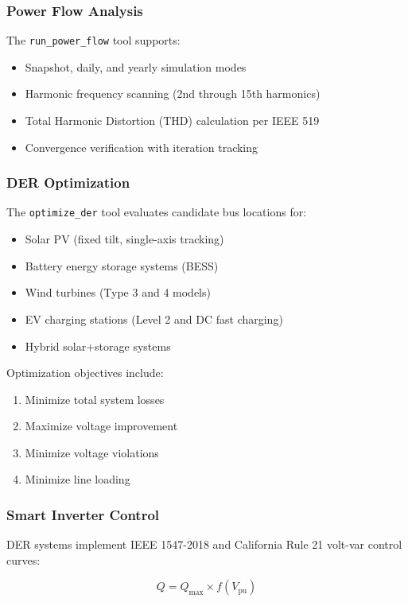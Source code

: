 \documentclass[review]{elsarticle}
\begin{document}
\subsubsection{Power Flow Analysis}
The \texttt{run\_power\_flow} tool supports:
\begin{itemize}
    \item Snapshot, daily, and yearly simulation modes
    \item Harmonic frequency scanning (2nd through 15th harmonics)
    \item Total Harmonic Distortion (THD) calculation per IEEE 519 \cite{ieee519}
    \item Convergence verification with iteration tracking
\end{itemize}

\subsubsection{DER Optimization}
The \texttt{optimize\_der} tool evaluates candidate bus locations for:
\begin{itemize}
    \item Solar PV (fixed tilt, single-axis tracking)
    \item Battery energy storage systems (BESS)
    \item Wind turbines (Type 3 and 4 models)
    \item EV charging stations (Level 2 and DC fast charging)
    \item Hybrid solar+storage systems
\end{itemize}

Optimization objectives include:
\begin{enumerate}
    \item Minimize total system losses
    \item Maximize voltage improvement
    \item Minimize voltage violations
    \item Minimize line loading
\end{enumerate}

\subsubsection{Smart Inverter Control}
DER systems implement IEEE 1547-2018 \cite{ieee1547} and California Rule 21 \cite{rule21} volt-var control curves:

\begin{equation}
Q = Q_{\text{max}} \times f(V_{\text{pu}})
\end{equation}
\end{document}
